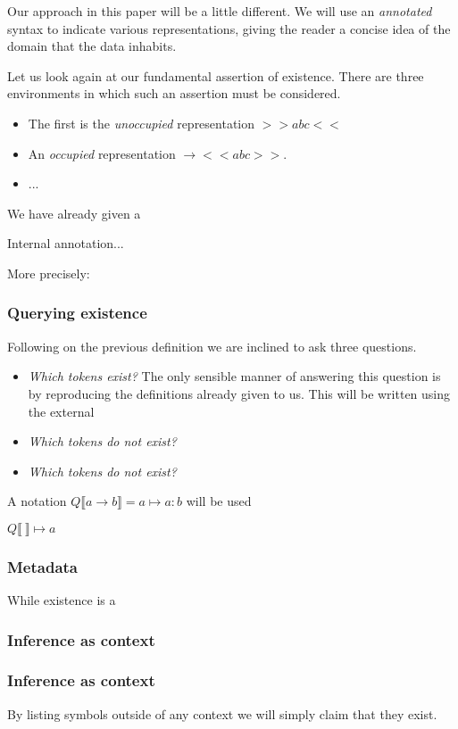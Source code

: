 \documentclass[11pt]{article}
\begin{document}
Our approach in this paper will be a little different. We will use an \emph{annotated} syntax to indicate various representations, giving the reader a concise idea of the domain that the data inhabits.

Let us look again at our fundamental assertion of existence. There are three environments in which such an assertion must be considered.
\begin{itemize}
\item The first is the \emph{unoccupied} representation $>>a b c<<$ %
\item An \emph{occupied} representation $\rightarrow <<a b c>>$.
\item ... 
\end{itemize}
We have already given a 

Internal annotation...

More precisely:



\subsubsection{Querying existence}
Following on the previous definition we are inclined to ask three questions.

\begin{itemize}
\item \emph{Which tokens exist?} The only sensible manner of answering this question is by reproducing the definitions already given to us. 
This will be written using the external 
\item \emph{Which tokens do not exist?}
\item \emph{Which tokens do not exist?}
\end{itemize}

A notation $Q\llbracket a \rightarrow b \rrbracket = a \mapsto a:b$ will be used

$Q\llbracket \ \rrbracket \mapsto a$


\subsubsection{Metadata}
While existence is a 

\subsubsection{Inference as context}



\subsubsection{Inference as context}
By listing symbols outside of any context we will simply claim that they exist.\\
\end{document}
